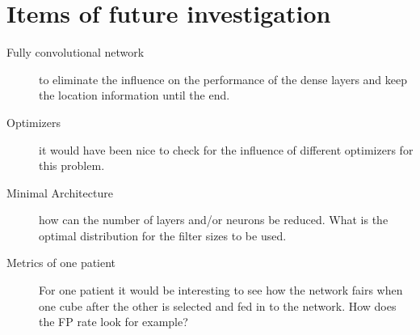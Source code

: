 \documentclass[main.tex]{subfiles}
\begin{document}
\section{Items of future investigation}
\begin{description}
\item[Fully convolutional network] to eliminate the influence on the performance of the dense layers and keep the location information until the end.
\item[Optimizers] it would have been nice to check for the influence of different optimizers for this problem.
\item[Minimal Architecture] how can the number of layers and/or neurons be reduced. What is the optimal distribution for the filter sizes to be used.
\item[Metrics of one patient] For one patient it would be interesting to see how the network fairs when one cube after the other is selected and fed in to the network. How does the FP rate look for example?
\end{description}

\end{document}
